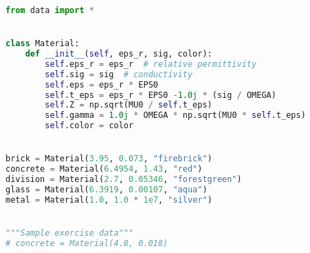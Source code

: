 \begin{lstlisting}[language=python]
from data import *


class Material:
    def __init__(self, eps_r, sig, color):
        self.eps_r = eps_r  # relative permittivity
        self.sig = sig  # conductivity
        self.eps = eps_r * EPS0
        self.t_eps = eps_r * EPS0 -1.0j * (sig / OMEGA)
        self.Z = np.sqrt(MU0 / self.t_eps)
        self.gamma = 1.0j * OMEGA * np.sqrt(MU0 * self.t_eps)
        self.color = color


brick = Material(3.95, 0.073, "firebrick")
concrete = Material(6.4954, 1.43, "red")
division = Material(2.7, 0.05346, "forestgreen")
glass = Material(6.3919, 0.00107, "aqua")
metal = Material(1.0, 1.0 * 1e7, "silver")


"""Sample exercise data"""
# concrete = Material(4.8, 0.018)

\end{lstlisting}